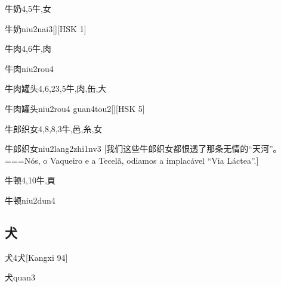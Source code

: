 \begin{Entry}{牛奶}{4,5}{⽜,⼥}
  \begin{Phonetics}{牛奶}{niu2nai3}[][HSK 1]
  \end{Phonetics}
\end{Entry}

\begin{Entry}{牛肉}{4,6}{⽜,⾁}
  \begin{Phonetics}{牛肉}{niu2rou4}
  \end{Phonetics}
\end{Entry}

\begin{Entry}{牛肉罐头}{4,6,23,5}{⽜,⾁,⽸,⼤}
  \begin{Phonetics}{牛肉罐头}{niu2rou4 guan4tou2}[][HSK 5]
  \end{Phonetics}
\end{Entry}

\begin{Entry}{牛郎织女}{4,8,8,3}{⽜,⾢,⽷,⼥}
  \begin{Phonetics}{牛郎织女}{niu2lang2zhi1nv3}
    [我们这些牛郎织女都恨透了那条无情的``天河''。===Nós, o Vaqueiro e a Tecelã, odiamos a implacável ``Via Láctea''.]
  \end{Phonetics}
\end{Entry}

\begin{Entry}{牛顿}{4,10}{⽜,⾴}
  \begin{Phonetics}{牛顿}{niu2dun4}
  \end{Phonetics}
\end{Entry}

\subsection*{犬}

\begin{Entry}{犬}{4}{⽝}[Kangxi 94]
  \begin{Phonetics}{犬}{quan3}
  \end{Phonetics}
\end{Entry}

